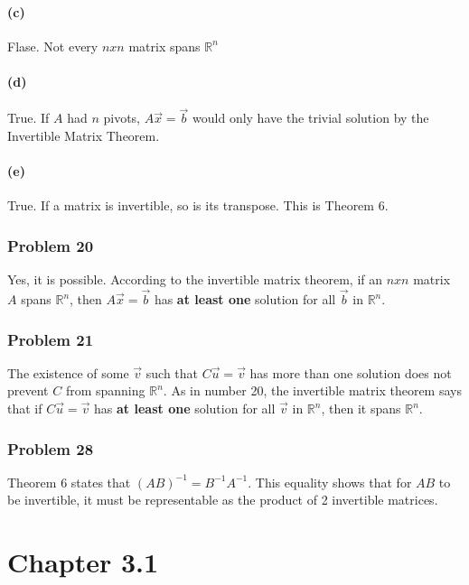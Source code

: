 \documentclass{article}%
\begin{document}
\paragraph{(c)} Flase. Not every $nxn$ matrix spans $\mathbb{R}^n$
\paragraph{(d)} True. If $A$ had $n$ pivots, $A\vec{x} = \vec{b}$ would only have the trivial solution by the Invertible Matrix Theorem.
\paragraph{(e)} True. If a matrix is invertible, so is its transpose. This is Theorem 6.

\subsubsection*{Problem 20}
Yes, it is possible. According to the invertible matrix theorem, if an $nxn$ matrix $A$ spans $\mathbb{R}^n$, then $A\vec{x} = \vec{b}$ has \textbf{at least one} solution for all $\vec{b}$ in $\mathbb{R}^n$.

\subsubsection*{Problem 21}
The existence of some $\vec{v}$ such that $C\vec{u} = \vec{v}$ has more than one solution does not prevent $C$ from spanning $\mathbb{R}^n$. As in number 20, the invertible matrix theorem says that if $C\vec{u} = \vec{v}$ has \textbf{at least one} solution for all $\vec{v}$ in $\mathbb{R}^n$, then it spans $\mathbb{R}^n$.

\subsubsection*{Problem 28}
Theorem 6 states that $(AB)^{-1} = B^{-1}A^{-1}$. This equality shows that for $AB$ to be invertible, it must be representable as the product of 2 invertible matrices.

\section{Chapter 3.1}
\end{document}
